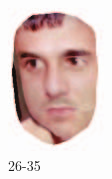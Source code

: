 \begin{figure}[t]
\begin{subfigure}[t]{0.2\textwidth}
		\includegraphics[width=\textwidth]{ilaware_cover4.png}
		\caption{26-35}
	\end{subfigure}
	\begin{subfigure}[t]{0.2\textwidth}

\end{subfigure}
\end{figure}
